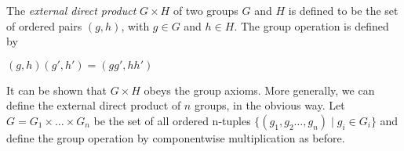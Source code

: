 \documentclass[12pt]{article}
\begin{document}
The \emph{external direct product} $G \times H$ of two groups $G$ and $H$ is defined to be the set of ordered pairs $(g,h)$, with $g\in G$ and $h\in H$. The group operation is defined by

$(g,h)(g',h') = (gg', hh')$

It can be shown that $G \times H$ obeys the group axioms. More generally, we can define the external direct product of $n$ groups, in the obvious way. Let $G = G_1 \times \ldots \times G_n$ be the set of all ordered n-tuples $\{(g_1, g_2 \ldots ,g_n) \mid g_i \in G_i\}$ and define the group operation by componentwise multiplication as before.
\end{document}

